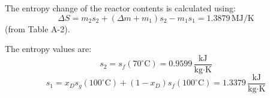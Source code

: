 The entropy change of the reactor contents is calculated using:  
\[
\Delta S = m_2 s_2 + (\Delta m + m_1) s_2 - m_1 s_1 = 1.3879 \, \text{MJ/K}
\]  
(from Table A-2).  

The entropy values are:  
\[
s_2 = s_f(70^\circ\text{C}) = 0.9599 \, \frac{\text{kJ}}{\text{kg·K}}
\]  
\[
s_1 = x_D s_g(100^\circ\text{C}) + (1 - x_D) s_f(100^\circ\text{C}) = 1.3379 \, \frac{\text{kJ}}{\text{kg·K}}
\]